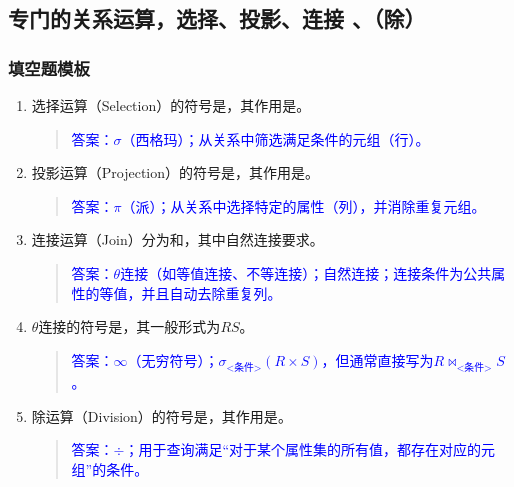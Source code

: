\documentclass[a4paper,12pt,UTF8,fontset=none]{ctexart}
\begin{document}
\subsection{专门的关系运算，选择、投影、连接  、（除） }
\subsubsection{填空题模板}

\begin{enumerate}[itemsep=1.2em]
    \item 选择运算（Selection）的符号是\underline{\hspace{2cm}}，其作用是\underline{\hspace{4cm}}。
    \begin{quote}
        \textcolor{blue}{答案：$\sigma$（西格玛）；从关系中筛选满足条件的元组（行）。}
    \end{quote}

    \item 投影运算（Projection）的符号是\underline{\hspace{2cm}}，其作用是\underline{\hspace{4cm}}。
    \begin{quote}
        \textcolor{blue}{答案：$\pi$（派）；从关系中选择特定的属性（列），并消除重复元组。}
    \end{quote}

    \item 连接运算（Join）分为\underline{\hspace{3cm}}和\underline{\hspace{3cm}}，其中自然连接要求\underline{\hspace{4cm}}。
    \begin{quote}
        \textcolor{blue}{答案：$\theta$连接（如等值连接、不等连接）；自然连接；连接条件为公共属性的等值，并且自动去除重复列。}
    \end{quote}

    \item $\theta$连接的符号是\underline{\hspace{2cm}}，其一般形式为$R$\underline{\hspace{2cm}}$S$。
    \begin{quote}
        \textcolor{blue}{答案：$\infty$（无穷符号）；$\sigma_{\text{<条件>}}(R\times S)$，但通常直接写为$R \Join_{\text{<条件>}} S$。}
    \end{quote}

    \item 除运算（Division）的符号是\underline{\hspace{2cm}}，其作用是\underline{\hspace{4cm}}。
    \begin{quote}
        \textcolor{blue}{答案：$\div$；用于查询满足“对于某个属性集的所有值，都存在对应的元组”的条件。}
    \end{quote}


\end{enumerate}
\end{document}
